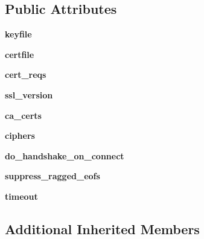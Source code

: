\subsection*{Public Attributes}
\begin{DoxyCompactItemize}
\item 
\mbox{\label{classgevent_1_1__ssl2_1_1_s_s_l_socket_af52d3bf9b1726db9a8e8a808de07fb16}} 
{\bfseries keyfile}
\item 
\mbox{\label{classgevent_1_1__ssl2_1_1_s_s_l_socket_a8155a55b887e65363d52b06bbbf5a90a}} 
{\bfseries certfile}
\item 
\mbox{\label{classgevent_1_1__ssl2_1_1_s_s_l_socket_ab860d7612bd08632c9d5d9c18135a0c5}} 
{\bfseries cert\+\_\+reqs}
\item 
\mbox{\label{classgevent_1_1__ssl2_1_1_s_s_l_socket_a0a4c01e26164c178a20980cd8ce5bc7b}} 
{\bfseries ssl\+\_\+version}
\item 
\mbox{\label{classgevent_1_1__ssl2_1_1_s_s_l_socket_a90ce628728a626c885668ae165f7e153}} 
{\bfseries ca\+\_\+certs}
\item 
\mbox{\label{classgevent_1_1__ssl2_1_1_s_s_l_socket_aa305a9c07e25bf02ec5afbb0f0253a1d}} 
{\bfseries ciphers}
\item 
\mbox{\label{classgevent_1_1__ssl2_1_1_s_s_l_socket_a8a6cc05bdb5a6c78c8346d57b8ee5448}} 
{\bfseries do\+\_\+handshake\+\_\+on\+\_\+connect}
\item 
\mbox{\label{classgevent_1_1__ssl2_1_1_s_s_l_socket_af71f120acac821029beedc8956fdab5f}} 
{\bfseries suppress\+\_\+ragged\+\_\+eofs}
\item 
\mbox{\label{classgevent_1_1__ssl2_1_1_s_s_l_socket_aede3c31715507346d28c38fd347a675f}} 
{\bfseries timeout}
\end{DoxyCompactItemize}
\subsection*{Additional Inherited Members}


